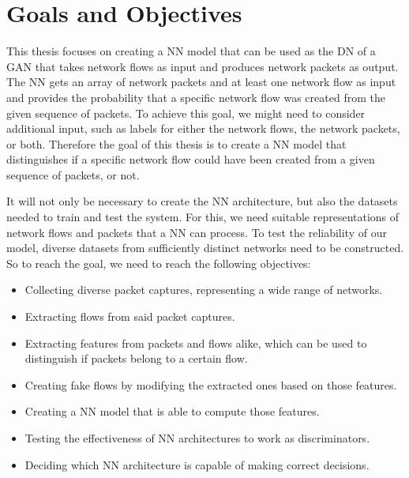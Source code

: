 \documentclass[
	ngerman,
	ruledheaders=section,%
	class=report,%
	thesis={type=bachelor},%
	accentcolor=9c,%
	custommargins=true,%
	marginpar=false,%
	parskip=half-,%
	fontsize=11pt,%
]{tudapub}
\begin{document}
\section{Goals and Objectives}
\label{sec:goals}



This thesis focuses on creating a NN model
that can be used as the DN of a GAN
that takes network flows as input and produces network packets as output.
The NN gets an array of network packets and at least one network flow as input
and provides the probability that a specific network flow was created from the given sequence of packets.
To achieve this goal, we might need to consider additional input,
such as labels for either the network flows, the network packets, or both.
Therefore the goal of this thesis is to create a NN model that distinguishes
if a specific network flow could have been created from a given sequence of packets, or not.

It will not only be necessary to create the NN architecture,
but also the datasets needed to train and test the system.
For this, we need suitable representations of network flows and packets that a NN can process.
To test the reliability of our model, diverse datasets from sufficiently distinct networks need to be constructed.
So to reach the goal, we need to reach the following objectives:

\begin{itemize}
  \item Collecting diverse packet captures, representing a wide range of networks.
  \item Extracting flows from said packet captures.
  \item Extracting features from packets and flows alike,
which can be used to distinguish if packets belong to a certain flow.
  \item Creating fake flows by modifying the extracted ones based on those features.
  \item Creating a NN model that is able to compute those features.
  \item Testing the effectiveness of NN architectures to work as discriminators.
  \item Deciding which NN architecture is capable of making correct decisions.
\end{itemize}
\end{document}
